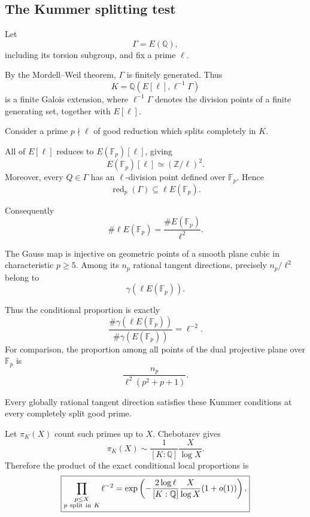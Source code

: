\documentclass[11pt]{article}
\begin{document}
\subsection{The Kummer splitting test}

Let
\[
\Gamma=E(\mathbb Q),
\]
including its torsion subgroup, and fix
a prime $\ell$.

By the Mordell--Weil theorem, $\Gamma$
is finitely generated. Thus
\[
K=\mathbb Q(E[\ell],\ell^{-1}\Gamma)
\]
is a finite Galois extension, where
$\ell^{-1}\Gamma$ denotes the division
points of a finite generating set,
together with $E[\ell]$.

Consider a prime $p\nmid\ell$ of good
reduction which splits completely in $K$.

All of $E[\ell]$ reduces to
$E(\mathbb F_p)[\ell]$, giving
\[
E(\mathbb F_p)[\ell]\simeq
(\mathbb Z/\ell)^2.
\]
Moreover, every $Q\in\Gamma$ has an
$\ell$-division point defined over
$\mathbb F_p$. Hence
\[
\operatorname{red}_p(\Gamma)
\subseteq\ell E(\mathbb F_p).
\]

Consequently
\begin{equation}\label{eq:kummer-index}
\boxed{
\#\ell E(\mathbb F_p)
=\frac{\#E(\mathbb F_p)}{\ell^2}.}
\end{equation}

The Gauss map is injective on geometric
points of a smooth plane cubic in
characteristic $p\ge5$.
Among its $n_p$ rational tangent
directions, precisely $n_p/\ell^2$
belong to
\[
\gamma(\ell E(\mathbb F_p)).
\]

Thus the conditional proportion is
exactly
\begin{equation}\label{eq:kummer-density}
\boxed{
\frac{\#\gamma(\ell E(\mathbb F_p))}
{\#\gamma(E(\mathbb F_p))}
=\ell^{-2}.}
\end{equation}
For comparison, the proportion among all points of the dual projective plane over $\mathbb F_p$ is
\[
\frac{n_p}{\ell^2(p^2+p+1)}.
\]

Every globally rational tangent direction
satisfies these Kummer conditions at
every completely split good prime.

Let $\pi_K(X)$ count such primes up to $X$.
Chebotarev gives
\[
\pi_K(X)\sim
\frac1{[K:\mathbb Q]}\frac X{\log X}.
\]
Therefore the product of the exact
conditional local proportions is
\begin{equation}\label{eq:kummer-product}
\boxed{
\prod_{\substack{p\le X\\p\ {\rm split\ in}\ K}}
\ell^{-2}
=
\exp\left(
-\frac{2\log\ell}{[K:\mathbb Q]}
\frac X{\log X}(1+o(1))
\right).}
\end{equation}
\end{document}
